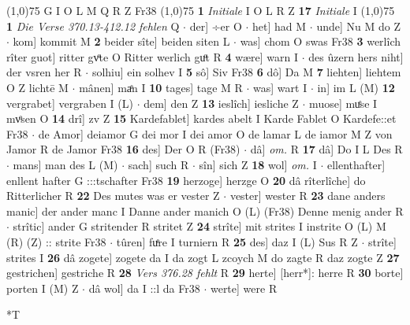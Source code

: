 \documentclass[8pt,a4paper,notitlepage]{article}
\begin{document}
\begin{table}[ht]
\begin{minipage}[t]{0.5\linewidth}
\begin{tabular}{rl}
\end{tabular}
\scriptsize
\line(1,0){75} \newline
G I O L M Q R Z Fr38 \newline
\line(1,0){75} \newline
\textbf{1} \textit{Initiale} I O L R Z  \textbf{17} \textit{Initiale} I  \newline
\line(1,0){75} \newline
\textbf{1} \textit{Die Verse 370.13-412.12 fehlen} Q   $\cdot$ der] ÷er O  $\cdot$ het] had M  $\cdot$ unde] Nu M do Z  $\cdot$ kom] kommit M \textbf{2} beider sîte] beiden siten L  $\cdot$ was] chom O swas Fr38 \textbf{3} werlîch rîter guot] ritter gvͦte O Ritter werlich guͦt R \textbf{4} wære] warn I  $\cdot$ des ûzern hers niht] der vsren her R  $\cdot$ solhiu] ein solhev I \textbf{5} sô] Siv Fr38 \textbf{6} dô] Da M \textbf{7} liehten] liehtem O Z lichtē M  $\cdot$ mânen] maͤn I \textbf{10} tages] tage M R  $\cdot$ was] wart I  $\cdot$ in] im L (M) \textbf{12} vergrabet] vergraben I (L)  $\cdot$ dem] den Z \textbf{13} ieslîch] iesliche Z  $\cdot$ muose] muͤse I mvͦsen O \textbf{14} drî] zv Z \textbf{15} Kardefablet] kardes abelt I Karde Fablet O Kardefe::et Fr38  $\cdot$ de Amor] deiamor G dei mor I dei amor O de lamar L de iamor M Z von Jamor R de Jamor Fr38 \textbf{16} des] Der O R (Fr38)  $\cdot$ dâ] \textit{om.} R \textbf{17} dâ] Do I L Des R  $\cdot$ mans] man des L (M)  $\cdot$ sach] such R  $\cdot$ sîn] sich Z \textbf{18} wol] \textit{om.} I  $\cdot$ ellenthafter] enllent hafter G :::tschafter Fr38 \textbf{19} herzoge] herzge O \textbf{20} dâ rîterlîche] do Ritterlicher R \textbf{22} Des mutes was er vester Z  $\cdot$ vester] wester R \textbf{23} dane anders manic] der ander manc I Danne ander manich O (L) (Fr38) Denne menig ander R  $\cdot$ strîtic] ander G stritender R stritet Z \textbf{24} strîte] mit strites I instrite O (L) M (R) (Z) :: strite Fr38  $\cdot$ tûren] fuͤre I turniern R \textbf{25} des] daz I (L) Sus R Z  $\cdot$ strîte] strites I \textbf{26} dâ zogete] zogete da I da zogt L zcoych M do zagte R daz zogte Z \textbf{27} gestrichen] gestriche R \textbf{28} \textit{Vers 376.28 fehlt} R  \textbf{29} herte] [herr*]: herre R \textbf{30} borte] porten I (M) Z  $\cdot$ dâ wol] da I ::l da Fr38  $\cdot$ werte] were R \newline
\end{minipage}
\hspace{0.5cm}
\begin{minipage}[t]{0.5\linewidth}
\small
\begin{center}*T

\end{center}
\end{minipage}
\end{table}
\end{document}
